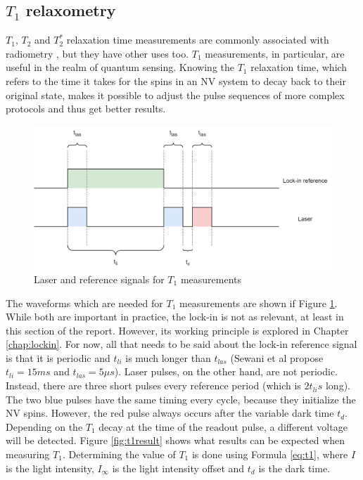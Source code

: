 \subsection{$T_1$ relaxometry}
$T_1$, $T_2$ and $T_2^*$ relaxation time measurements are commonly associated with radiometry \cite{ballinger23}, but they have other uses too. $T_1$ measurements, in particular, are useful in the realm of quantum sensing. Knowing the $T_1$ relaxation time, which refers to the time it takes for the spins in an NV system to decay back to their original state, makes it possible to adjust the pulse sequences of more complex protocols and thus get better results.  %

\begin{figure}[ht]
	\centering
	\includegraphics[width=0.9\linewidth]{drawio_diagrams/t1_waveforms.drawio}
	\caption{Laser and reference signals for $T_1$ measurements}
	\label{fig:t1waveforms}
\end{figure}

The waveforms which are needed for $T_1$ measurements are shown if Figure \ref{fig:t1waveforms}. While both are important in practice, the lock-in is not as relevant, at least in this section of the report. However, its working principle is explored in Chapter \ref{chap:lockin}. For now, all that needs to be said about the lock-in reference signal is that it is periodic and $t_{li}$ is much longer than $t_{las}$ (Sewani et al \cite{sewani2020coherent} propose $t_{li} = 15 ms$ and $t_{las} = 5 \mu s$). Laser pulses, on the other hand, are not periodic. Instead, there are three short pulses every reference period (which is $2t_{li} s$ long). The two blue pulses have the same timing every cycle, because they initialize the NV spins. However, the red pulse always occurs after the variable dark time $t_d$. Depending on the $T_1$ decay at the time of the readout pulse, a different voltage will be detected. Figure \ref{fig:t1result} shows what results can be expected when measuring $T_1$. Determining the value of $T_1$ is done using Formula \ref{eq:t1}, where $I$ is the light intensity, $I_\infty$ is the light intensity offset and $t_d$ is the dark time. 

